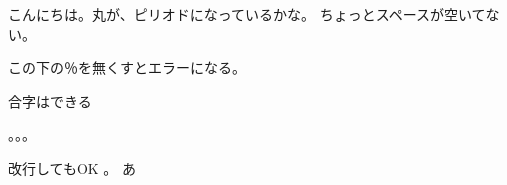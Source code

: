 \documentclass[dvipdfmx,uplatex,a4j]{jsarticle}
\begin{document}
こんにちは。丸が、ピリオドになっているかな。
ちょっとスペースが空いてない。

この下の％を無くすとエラーになる。

合字はできる

。。。

改行してもOK
。
あ
\end{document}
